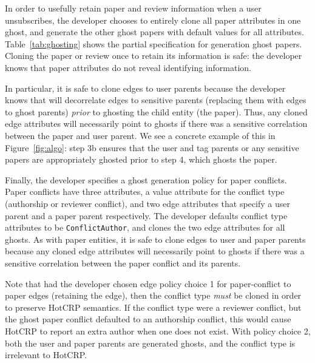 In order to usefully retain paper and review information when a user unsubscribes, the developer chooses to
entirely clone all paper attributes in one ghost, and generate the other ghost papers with default
values for all attributes. Table~\ref{tab:ghosting} shows the partial specification for generation
ghost papers. Cloning the paper or review once to retain its information is safe: the developer knows that
paper attributes do not reveal identifying information.

In particular, it is safe to clone edges to user parents because the developer knows that \sys will
decorrelate edges to sensitive parents (replacing them with edges to ghost parents) \emph{prior} to
ghosting the child entity (the paper). Thus, any cloned edge attributes will necessarily point to
ghosts if there was a sensitive correlation between the paper and user parent.  We see a concrete
example of this in Figure~\ref{fig:algo}: step 3b ensures that the user and tag parents or any
sensitive papers are appropriately ghosted prior to step 4, which ghosts the paper.

Finally, the developer specifies a ghost generation policy for paper conflicts. Paper conflicts have three attributes,
a value attribute for the conflict type (authorship or reviewer conflict), and two edge attributes
that specify a user parent and a paper parent respectively. The developer defaults conflict type
attributes to be \texttt{ConflictAuthor}, and clones the two edge attributes for all ghosts.
As with paper entities, it is safe to clone edges to user and paper parents because any cloned edge
attributes will necessarily point to ghosts if there was a sensitive correlation between the paper
conflict and its parents. 

Note that had the developer chosen edge policy choice 1 for paper-conflict to paper edges
(retaining the edge), then the conflict type \emph{must} be cloned in order to preserve HotCRP
semantics. If the conflict type were a reviewer conflict, but the ghost paper conflict defaulted to an
authorship conflict, this would cause HotCRP to report an extra author when one does not exist.
With policy choice 2, both the user and paper parents are generated ghosts, and the conflict type is
irrelevant to HotCRP.

\iffalse
